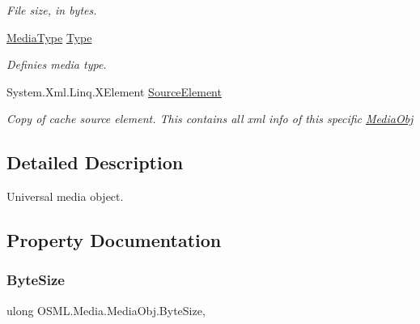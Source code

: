\begin{DoxyCompactItemize}
\begin{DoxyCompactList}\small\item\em File size, in bytes. \end{DoxyCompactList}\item 
\mbox{\hyperlink{namespaceOSML_1_1Media_aa3e4261aa5181fcc93920ffe409e8b02}{Media\+Type}} \mbox{\hyperlink{classOSML_1_1Media_1_1MediaObj_a84e20f6bdfd69916e9aed53a8a825e89}{Type}}
\begin{DoxyCompactList}\small\item\em Definies media type. \end{DoxyCompactList}\item 
System.\+Xml.\+Linq.\+X\+Element \mbox{\hyperlink{classOSML_1_1Media_1_1MediaObj_a0fc7d13161beb890a1b63f116c379a98}{Source\+Element}}
\begin{DoxyCompactList}\small\item\em Copy of cache source element. This contains all xml info of this specific \mbox{\hyperlink{classOSML_1_1Media_1_1MediaObj}{Media\+Obj}} \end{DoxyCompactList}\end{DoxyCompactItemize}


\subsection{Detailed Description}
Universal media object. 



\subsection{Property Documentation}
\mbox{\label{classOSML_1_1Media_1_1MediaObj_a4751d437d47b5634ab48868e56ffa89a}} 
\subsubsection{\texorpdfstring{ByteSize}{ByteSize}}
{\footnotesize\ttfamily ulong O\+S\+M\+L.\+Media.\+Media\+Obj.\+Byte\+Size\hspace{0.3cm}{\ttfamily [get]}, {\ttfamily [set]}}



